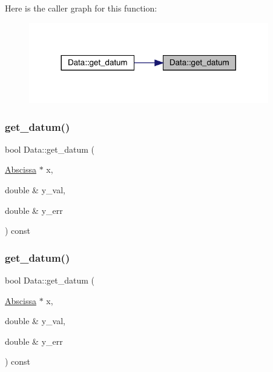 Here is the caller graph for this function\+:
\nopagebreak
\begin{figure}[H]
\begin{center}
\leavevmode
\includegraphics[width=296pt]{d0/df3/classData_ad7e50542712441af6ad2a227193a777f_icgraph}
\end{center}
\end{figure}
\mbox{\label{classData_aab2d2ba01acb88ede5beb3ab54053d73}} 
\subsubsection{\texorpdfstring{get\_datum()}{get\_datum()}\hspace{0.1cm}{\footnotesize\ttfamily [3/4]}}
{\footnotesize\ttfamily bool Data\+::get\+\_\+datum (\begin{DoxyParamCaption}\item[{\mbox{\hyperlink{classAbscissa}{Abscissa}} $\ast$}]{x,  }\item[{double \&}]{y\+\_\+val,  }\item[{double \&}]{y\+\_\+err }\end{DoxyParamCaption}) const}

\mbox{\label{classData_aab2d2ba01acb88ede5beb3ab54053d73}} 
\subsubsection{\texorpdfstring{get\_datum()}{get\_datum()}\hspace{0.1cm}{\footnotesize\ttfamily [4/4]}}
{\footnotesize\ttfamily bool Data\+::get\+\_\+datum (\begin{DoxyParamCaption}\item[{\mbox{\hyperlink{classAbscissa}{Abscissa}} $\ast$}]{x,  }\item[{double \&}]{y\+\_\+val,  }\item[{double \&}]{y\+\_\+err }\end{DoxyParamCaption}) const}

